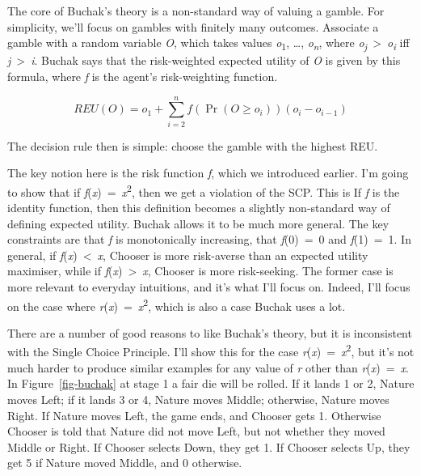 \documentclass[
  10pt,
  letterpaper,
  DIV=11,
  numbers=noendperiod,
  twoside]{scrartcl}
\begin{document}
The core of Buchak's theory is a non-standard way of valuing a gamble.
For simplicity, we'll focus on gambles with finitely many outcomes.
Associate a gamble with a random variable \emph{O}, which takes values
\emph{o}\textsubscript{1}, \ldots, \emph{o\textsubscript{n}}, where
\emph{o\textsubscript{j}}~\textgreater~\emph{o\textsubscript{i}} iff
\emph{j}~\textgreater~\emph{i}. Buchak says that the risk-weighted
expected utility of \emph{O} is given by this formula, where \emph{f} is
the agent's risk-weighting function.

\[
REU(O) = o_1 + \sum_{i = 2}^n f(\Pr(O \geq o_i))(o_i - o_{i-1})
\]

The decision rule then is simple: choose the gamble with the highest
REU.

The key notion here is the risk function \emph{f}, which we introduced
earlier. I'm going to show that if
\emph{f}(\emph{x})~=~\emph{x}\textsuperscript{2}, then we get a
violation of the SCP. This is If \emph{f} is the identity function, then
this definition becomes a slightly non-standard way of defining expected
utility. Buchak allows it to be much more general. The key constraints
are that \emph{f} is monotonically increasing, that \emph{f}(0)~=~0 and
\emph{f}(1)~=~1. In general, if \emph{f}(\emph{x})~\textless~\emph{x},
Chooser is more risk-averse than an expected utility maximiser, while if
\emph{f}(\emph{x})~\textgreater~\emph{x}, Chooser is more risk-seeking.
The former case is more relevant to everyday intuitions, and it's what
I'll focus on. Indeed, I'll focus on the case where
\emph{r}(\emph{x})~=~\emph{x}\textsuperscript{2}, which is also a case
Buchak uses a lot.

There are a number of good reasons to like Buchak's theory, but it is
inconsistent with the Single Choice Principle. I'll show this for the
case \emph{r}(\emph{x})~=~\emph{x}\textsuperscript{2}, but it's not much
harder to produce similar examples for any value of \emph{r} other than
\emph{r}(\emph{x})~=~\emph{x}. In Figure~\ref{fig-buchak} at stage 1 a
fair die will be rolled. If it lands 1 or 2, Nature moves Left; if it
lands 3 or 4, Nature moves Middle; otherwise, Nature moves Right. If
Nature moves Left, the game ends, and Chooser gets 1. Otherwise Chooser
is told that Nature did not move Left, but not whether they moved Middle
or Right. If Chooser selects Down, they get 1. If Chooser selects Up,
they get 5 if Nature moved Middle, and 0 otherwise.
\end{document}
